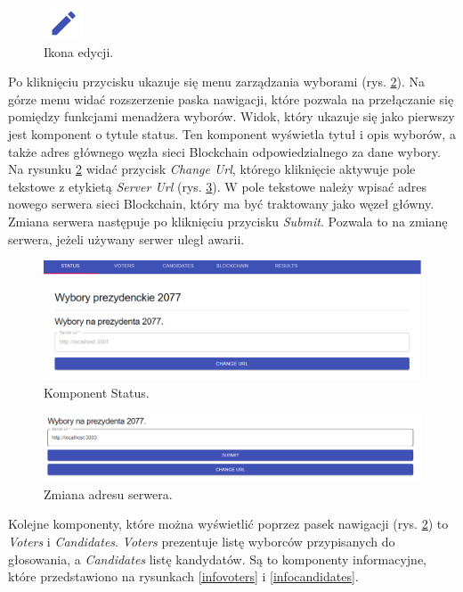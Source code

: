 \documentclass[a4paper,12pt]{book}
\begin{document}
\begin{figure}[h]
	\centering
	\includegraphics{images/penicon.png}
	\caption{Ikona edycji.}\label{penicon}
\end {figure}

Po kliknięciu przycisku ukazuje się menu zarządzania wyborami (rys. \ref{electionmanager}). Na górze menu widać rozszerzenie paska nawigacji, które pozwala na przełączanie się pomiędzy funkcjami menadżera wyborów. Widok, który ukazuje się jako pierwszy jest komponent o tytule status. Ten komponent wyświetla tytuł i opis wyborów, a także adres głównego węzła sieci Blockchain odpowiedzialnego za dane wybory. Na rysunku \ref{electionmanager} widać przycisk \textit{Change Url}, którego kliknięcie aktywuje pole tekstowe z etykietą \textit{Server Url} (rys. \ref{changeurl}). W pole tekstowe należy wpisać adres nowego serwera sieci Blockchain, który ma być traktowany jako węzeł główny. Zmiana serwera następuje po kliknięciu przycisku \textit{Submit}. Pozwala to na zmianę serwera, jeżeli używany serwer uległ awarii.

\begin{figure}[h]
	\centering
	\includegraphics[width=\textwidth]{images/electionmanager.png}
	\caption{Komponent Status.}\label{electionmanager}
\end {figure}

\begin{figure}[H]
	\centering
	\includegraphics[width=\textwidth]{images/changeurl.png}
	\caption{Zmiana adresu serwera.}\label{changeurl}
\end {figure}

Kolejne komponenty, które można wyświetlić poprzez pasek nawigacji (rys. \ref{electionmanager}) to \textit{Voters} i \textit{Candidates}. \textit{Voters} prezentuje listę wyborców przypisanych do głosowania, a \textit{Candidates} listę kandydatów. Są to komponenty informacyjne, które przedstawiono na rysunkach \ref{infovoters} i \ref{infocandidates}.
\end{document}
